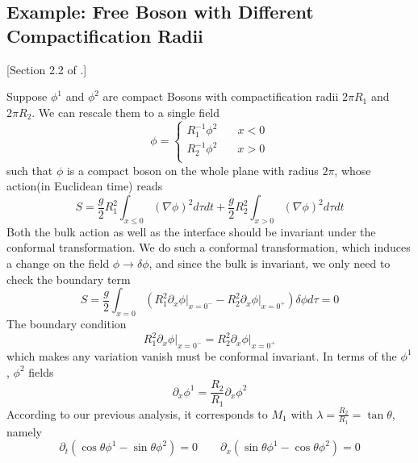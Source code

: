 \documentclass{article}
\begin{document}
\subsection{Example: Free Boson with Different Compactification Radii}

[Section 2.2 of \cite{bachas_permeable_2002}.]

Suppose $\phi^1$ and $\phi^2$ are compact Bosons with compactification radii $2\pi R_1$ and $2\pi R_2$. We can rescale them to a single field 
\begin{equation}
\phi = \left\lbrace
       \begin{aligned}
         R_1^{-1} \phi^2  & \quad  x < 0 \\
         R_2^{-1} \phi^2  & \quad x > 0  \\
       \end{aligned} \right. 
\end{equation}
such that $\phi$ is a compact boson on the whole plane with radius $2\pi$, whose action(in Euclidean time) reads
\begin{equation}
S = \frac{g}{2} R_1^2 \int_{x \le 0 } \left(  \nabla \phi \right)^2 d\tau dt  + \frac{g}{2} R_2^2 \int_{x > 0 } \left(  \nabla \phi  \right)^2 d\tau dt 
\end{equation}
Both the bulk action as well as the interface should be invariant under the conformal transformation. We do such a conformal transformation, which induces a change on the field $\phi \rightarrow \delta \phi $, and since the bulk is invariant, we only need to check the boundary term
\begin{equation}
S = \frac{g}{2} \int_{x = 0 } ( R_1^2 \partial_x \phi\big|_{x = 0^{-}}   - R_2 ^2 \partial_x \phi \big|_{x = 0^{+}} ) \delta \phi  d\tau = 0
\end{equation}
The boundary condition
\begin{equation}
R_1^2 \partial_x \phi\big|_{x = 0^{-}}  = R_2 ^2 \partial_x \phi \big|_{x = 0^{+}}
\end{equation}
which makes any variation vanish must be conformal invariant. In terms of the $\phi^1$, $\phi^2$ fields
\begin{equation}
\partial_x \phi^1 = \frac{R_2}{R_1} \partial_x \phi^2 
\end{equation}
According to our previous analysis, it corresponds to $M_1$ with $\lambda = \frac{R_2}{R_1} = \tan \theta$, namely
\begin{equation}
\label{eq:cpt_boson_bd}
\partial_t ( \cos \theta \phi^1  - \sin \theta \phi^2 ) = 0 \qquad \partial_x ( \sin \theta \phi^1  - \cos \theta \phi^2 ) = 0
\end{equation}
\end{document}
